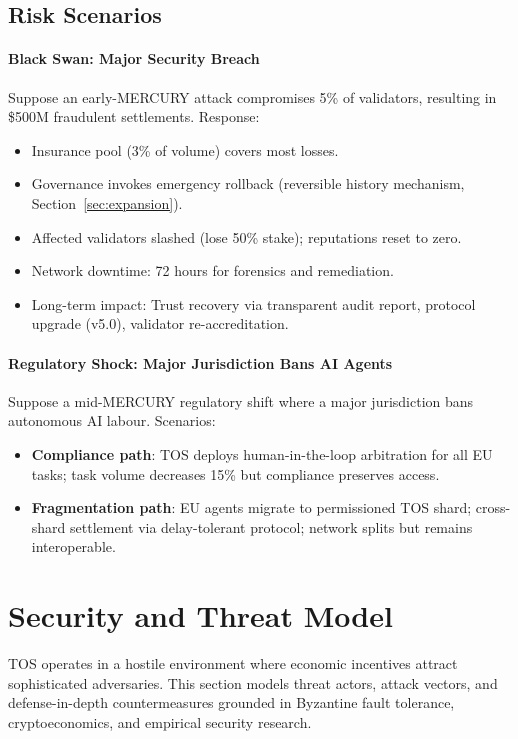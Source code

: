 \documentclass[11pt]{article}
\begin{document}
\subsection{Risk Scenarios}
\paragraph{Black Swan: Major Security Breach}
Suppose an early-MERCURY attack compromises 5\% of validators, resulting in \$500M fraudulent settlements. Response:
\begin{itemize}[noitemsep]
  \item Insurance pool (3\% of volume) covers most losses.
  \item Governance invokes emergency rollback (reversible history mechanism, Section~\ref{sec:expansion}).
  \item Affected validators slashed (lose 50\% stake); reputations reset to zero.
  \item Network downtime: 72 hours for forensics and remediation.
  \item Long-term impact: Trust recovery via transparent audit report, protocol upgrade (v5.0), validator re-accreditation.
\end{itemize}

\paragraph{Regulatory Shock: Major Jurisdiction Bans AI Agents}
Suppose a mid-MERCURY regulatory shift where a major jurisdiction bans autonomous AI labour. Scenarios:
\begin{itemize}[noitemsep]
  \item \textbf{Compliance path}: TOS deploys human-in-the-loop arbitration for all EU tasks; task volume decreases 15\% but compliance preserves access.
  \item \textbf{Fragmentation path}: EU agents migrate to permissioned TOS shard; cross-shard settlement via delay-tolerant protocol; network splits but remains interoperable.
\end{itemize}

\section{Security and Threat Model}
\label{sec:security}

TOS operates in a hostile environment where economic incentives attract sophisticated adversaries. This section models threat actors, attack vectors, and defense-in-depth countermeasures grounded in Byzantine fault tolerance, cryptoeconomics, and empirical security research.
\end{document}
